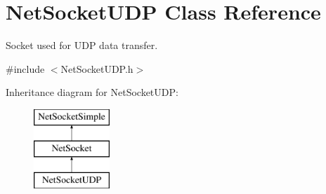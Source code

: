 \hypertarget{class_net_socket_u_d_p}{
\section{NetSocketUDP Class Reference}
\label{class_net_socket_u_d_p}
}


Socket used for UDP data transfer.  




{\ttfamily \#include $<$NetSocketUDP.h$>$}

Inheritance diagram for NetSocketUDP:\begin{figure}[H]
\begin{center}
\leavevmode
\includegraphics[height=3.000000cm]{class_net_socket_u_d_p}
\end{center}
\end{figure}
